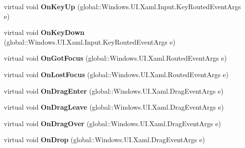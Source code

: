 \begin{DoxyCompactItemize}
virtual void {\bfseries On\+Key\+Up} (global\+::\+Windows.\+U\+I.\+Xaml.\+Input.\+Key\+Routed\+Event\+Args e)
\item 
\mbox{\label{class_windows_1_1_u_i_1_1_xaml_1_1_controls_1_1_control_aaebebc38e0d403c52a9c26f0ce100664}} 
virtual void {\bfseries On\+Key\+Down} (global\+::\+Windows.\+U\+I.\+Xaml.\+Input.\+Key\+Routed\+Event\+Args e)
\item 
\mbox{\label{class_windows_1_1_u_i_1_1_xaml_1_1_controls_1_1_control_aebc0df2e4f8c22faf21c84575482274e}} 
virtual void {\bfseries On\+Got\+Focus} (global\+::\+Windows.\+U\+I.\+Xaml.\+Routed\+Event\+Args e)
\item 
\mbox{\label{class_windows_1_1_u_i_1_1_xaml_1_1_controls_1_1_control_a68f0c26b5b04bbbeb841be1d3a195224}} 
virtual void {\bfseries On\+Lost\+Focus} (global\+::\+Windows.\+U\+I.\+Xaml.\+Routed\+Event\+Args e)
\item 
\mbox{\label{class_windows_1_1_u_i_1_1_xaml_1_1_controls_1_1_control_ae5a8a218b89ca66425059a8e09fc0c0d}} 
virtual void {\bfseries On\+Drag\+Enter} (global\+::\+Windows.\+U\+I.\+Xaml.\+Drag\+Event\+Args e)
\item 
\mbox{\label{class_windows_1_1_u_i_1_1_xaml_1_1_controls_1_1_control_a1812d64c2440d2cd9f93660273ef5896}} 
virtual void {\bfseries On\+Drag\+Leave} (global\+::\+Windows.\+U\+I.\+Xaml.\+Drag\+Event\+Args e)
\item 
\mbox{\label{class_windows_1_1_u_i_1_1_xaml_1_1_controls_1_1_control_a5c8a657f99279b16e32bf35998d46838}} 
virtual void {\bfseries On\+Drag\+Over} (global\+::\+Windows.\+U\+I.\+Xaml.\+Drag\+Event\+Args e)
\item 
\mbox{\label{class_windows_1_1_u_i_1_1_xaml_1_1_controls_1_1_control_ade79c678fe0c5aa32e43c4772d34e61e}} 
virtual void {\bfseries On\+Drop} (global\+::\+Windows.\+U\+I.\+Xaml.\+Drag\+Event\+Args e)

\end{DoxyCompactItemize}
